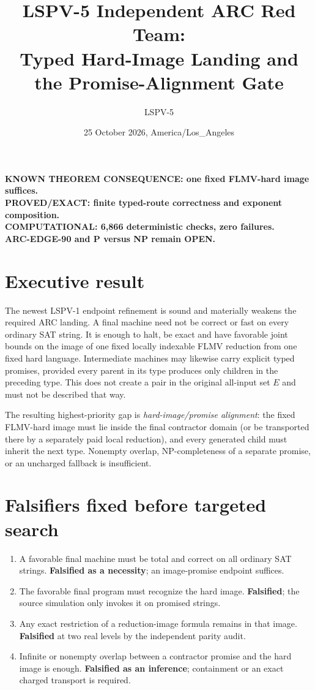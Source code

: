 \documentclass[11pt]{article}
\title{LSPV-5 Independent ARC Red Team:\\Typed Hard-Image Landing and the Promise-Alignment Gate}
\author{LSPV-5}
\date{25 October 2026, America/Los\_Angeles}
\begin{document}
\maketitle

\begin{center}
\textbf{KNOWN THEOREM CONSEQUENCE: one fixed FLMV-hard image suffices.}\\
\textbf{PROVED/EXACT: finite typed-route correctness and exponent composition.}\\
\textbf{COMPUTATIONAL: 6,866 deterministic checks, zero failures.}\\
\textbf{ARC-EDGE-90 and P versus NP remain OPEN.}
\end{center}

\section{Executive result}
The newest LSPV-1 endpoint refinement is sound and materially weakens the
required ARC landing.  A final machine need not be correct or fast on every
ordinary SAT string.  It is enough to halt, be exact and have favorable joint
bounds on the image of one fixed locally indexable FLMV reduction from one
fixed hard language.  Intermediate machines may likewise carry explicit
typed promises, provided every parent in its type produces only children in
the preceding type.  This does not create a pair in the original all-input set
$E$ and must not be described that way.

The resulting highest-priority gap is \emph{hard-image/promise alignment}:
the fixed FLMV-hard image must lie inside the final contractor domain (or be
transported there by a separately paid local reduction), and every generated
child must inherit the next type.  Nonempty overlap, NP-completeness of a
separate promise, or an uncharged fallback is insufficient.

\section{Falsifiers fixed before targeted search}
\begin{enumerate}
\item A favorable final machine must be total and correct on all ordinary SAT
strings.  \textbf{Falsified as a necessity}; an image-promise endpoint suffices.
\item The favorable final program must recognize the hard image.
\textbf{Falsified}; the source simulation only invokes it on promised strings.
\item Any exact restriction of a reduction-image formula remains in that
image.  \textbf{Falsified} at two real levels by the independent parity audit.
\item Infinite or nonempty overlap between a contractor promise and the hard
image is enough.  \textbf{Falsified as an inference}; containment or an exact
charged transport is required.
\end{enumerate}
\end{document}
